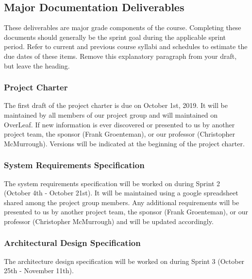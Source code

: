 
\subsection{Major Documentation Deliverables}
These deliverables are major grade components of the course. Completing these documents should generally be the sprint goal during the applicable sprint period. Refer to current and previous course syllabi and schedules to estimate the due dates of these items. Remove this explanatory paragraph from your draft, but leave the heading.

\subsubsection{Project Charter}
The first draft of the project charter is due on October 1st, 2019. It will be maintained by all members of our project group and will maintained on OverLeaf. If new information is ever discovered or presented to us by another project team, the sponsor (Frank Groenteman), or our professor (Christopher McMurrough). Versions will be indicated at the beginning of the project charter. 

\subsubsection{System Requirements Specification}
The system requirements specification will be worked on during Sprint 2 (October 4th - October 21st). It will be maintained using a google spreadsheet shared among the project group members. Any additional requirements will be presented to us by another project team, the sponsor (Frank Groenteman), or our professor (Christopher McMurrough) and will be updated accordingly.


\subsubsection{Architectural Design Specification}
The architecture design specification will be worked on during Sprint 3 (October 25th - November 11th). 


